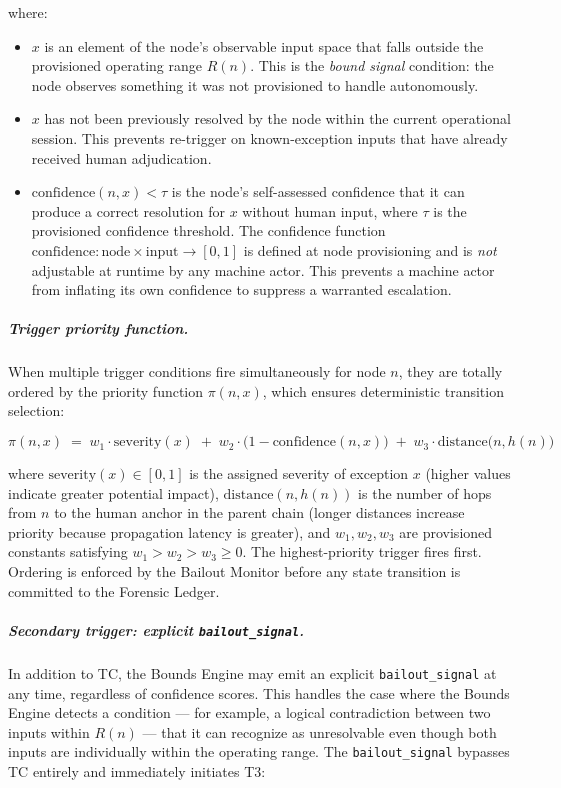where:

\begin{itemize}\itemsep0em
\item[(i)] $x$ is an element of the node's observable input space that falls outside the provisioned operating range $R(n)$. This is the \emph{bound signal} condition: the node observes something it was not provisioned to handle autonomously.
\item[(ii)] $x$ has not been previously resolved by the node within the current operational session. This prevents re-trigger on known-exception inputs that have already received human adjudication.
\item[(iii)] $\text{confidence}(n, x) < \tau$ is the node's self-assessed confidence that it can produce a correct resolution for $x$ without human input, where $\tau$ is the provisioned confidence threshold. The confidence function $\text{confidence} : \text{node} \times \text{input} \rightarrow [0, 1]$ is defined at node provisioning and is \emph{not} adjustable at runtime by any machine actor. This prevents a machine actor from inflating its own confidence to suppress a warranted escalation.
\end{itemize}

\subparagraph{Trigger priority function.} When multiple trigger conditions fire simultaneously for node $n$, they are totally ordered by the priority function $\pi(n, x)$, which ensures deterministic transition selection:

\begin{equation}
\pi(n, x) \;=\; w_1 \cdot \text{severity}(x) \;+\; w_2 \cdot \bigl(1 - \text{confidence}(n, x)\bigr) \;+\; w_3 \cdot \text{distance}\bigl(n, h(n)\bigr) \tag{PF}
\end{equation}

where $\text{severity}(x) \in [0, 1]$ is the assigned severity of exception $x$ (higher values indicate greater potential impact), $\text{distance}(n, h(n))$ is the number of hops from $n$ to the human anchor in the parent chain (longer distances increase priority because propagation latency is greater), and $w_1, w_2, w_3$ are provisioned constants satisfying $w_1 > w_2 > w_3 \geq 0$. The highest-priority trigger fires first. Ordering is enforced by the Bailout Monitor before any state transition is committed to the Forensic Ledger.

\subparagraph{Secondary trigger: explicit \texttt{bailout\_signal}.} In addition to TC, the Bounds Engine may emit an explicit \texttt{bailout\_signal} at any time, regardless of confidence scores. This handles the case where the Bounds Engine detects a condition — for example, a logical contradiction between two inputs within $R(n)$ — that it can recognize as unresolvable even though both inputs are individually within the operating range. The \texttt{bailout\_signal} bypasses TC entirely and immediately initiates T3:

